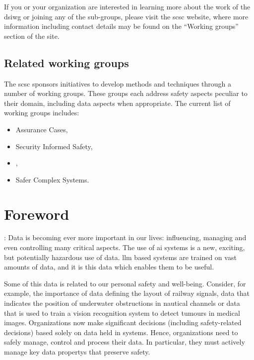 If you or your organization are interested in learning more about the work of the \gls{dsiwg} or joining any of the sub-groups,
please visit the \gls{scsc} website, where more information including contact details may be found on the ``Working groups'' section of the site.
%
%
%
\subsection*{Related working groups}
The \gls{scsc} sponsors initiatives to develop methods and techniques through a number of working groups. These groups each address safety aspects peculiar to their domain, including data aspects when appropriate. The current list of working groups includes:
%
\begin{itemize}
	\item Assurance Cases,
	\item Security Informed Safety,
	\item {},
	\item Safer Complex Systems. 
\end{itemize}
%
%
\clearpage
%

\makeatletter		%
\dsiwg@intblankpage
\makeatother

\pagestyle{FirstPageFrontMatter}
\section*{Foreword}


:
Data is becoming ever more important in our lives: influencing, managing and even controlling many critical aspects.
The use of \gls{ai} systems is a new, exciting, but potentially hazardous use of data. \Gls{llm} based systems are trained on vast amounts of data, and it is this data which enables them to be useful.

Some of this data is related to our personal safety and well-being.
Consider, for example, the importance of data defining the layout of railway signals,
data that indicates the position of underwater obstructions in nautical channels or data that
is used to train a vision recognition system to detect tumours in medical images.
Organizations now make significant decisions (including safety-related decisions) based solely on data held in systems.
Hence, organizations need to safely manage, control and process their data.
In particular, they must actively manage key \glspl{data property} that preserve safety.

